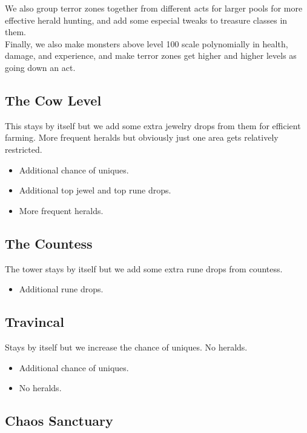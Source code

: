 \documentclass[12pt,a4paper]{article}
\begin{document}
We also group terror zones together from different acts for larger pools for more effective herald hunting, and add some especial tweaks to treasure classes in them.\\

Finally, we also make monsters above level 100 scale polynomially in health, damage, and experience, and make terror zones get higher and higher levels as going down an act.\\

\subsection{The Cow Level}

This stays by itself but we add some extra jewelry drops from them for efficient farming. More frequent heralds but obviously just one area gets relatively restricted.

\begin{itemize}
\item Additional chance of uniques.
\item Additional top jewel and top rune drops.
\item More frequent heralds.
\end{itemize}

\subsection{The Countess}

The tower stays by itself but we add some extra rune drops from countess.

\begin{itemize}
\item Additional rune drops.
\end{itemize}

\subsection{Travincal}

Stays by itself but we increase the chance of uniques. No heralds.

\begin{itemize}
\item Additional chance of uniques.
\item No heralds.
\end{itemize}

\subsection{Chaos Sanctuary}
\end{document}
